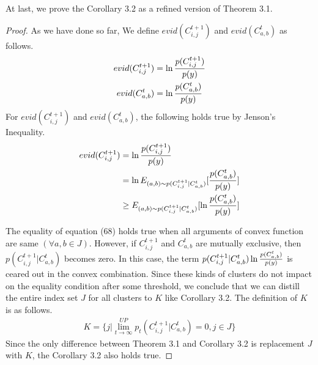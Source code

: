 At last, we prove the Corollary 3.2 as a refined version of Theorem 3.1. 
\begin{proof}
As we have done so far, We define $evid(C^{t+1}_{i,j})$ and $evid(C^t_{a,b})$ as follows.
\begin{align}
    evid(C^{t+1}_{i,j}) &= \ln{p(C^{t+1}_{i,j}) \over p(y)}\\
    evid(C^t_{a,b}) &= \ln{p(C^t_{a,b}) \over p(y)}
\end{align}
For $evid(C^{t+1}_{i,j})$ and $evid(C^t_{a,b})$, the following holds true by Jenson's Inequality. 
\begin{align}
    \begin{split}
        evid(C^{t+1}_{i,j}) &= \ln{p(C^{t+1}_{i,j}) \over p(y)}\\
                        &= \ln E_{(a,b) \sim p(C^{t+1}_{i,j}|C^t_{a,b})}[{p(C^t_{a,b}) \over p(y)}]\\
                        &\geq E_{(a,b) \sim p(C^{t+1}_{i,j}|C^{t}_{a,b})}[\ln{p(C^t_{a,b})\over p(y)}]
    \end{split}
\end{align}

The equality of equation (68) holds true when all arguments of convex function are same 
$(\forall a, b \in J)$. 
However, if $C^{t+1}_{i,j}$ and $C^{t}_{a,b}$ are mutually exclusive, then 
$p(C^{t+1}_{i,j}|C^{t}_{a,b})$ becomes zero. 
In this case, the term $p(C^{t+1}_{i,j}|C^{t}_{a,b})\ln {p(C^{t}_{a,b}) \over p(y)}$
is ceared out in the convex combination. 
Since these kinds of clusters do not impact on the equality condition after some threshold,
we conclude that we can distill the entire index set $J$ for all clusters
to $K$ like Corollary 3.2.
The definition of $K$ is as follows. 
\begin{align}
    K = \{j | \lim^{UP}_{t \rightarrow \infty} p_t(C^{t+1}_{i,j}|C^{t}_{a,b})=0 ,j \in J\} 
\end{align}
Since the only difference between Theorem 3.1 and Corollary 3.2 is replacement $J$ with $K$, 
the Corollary 3.2 also holds true. 
\end{proof}